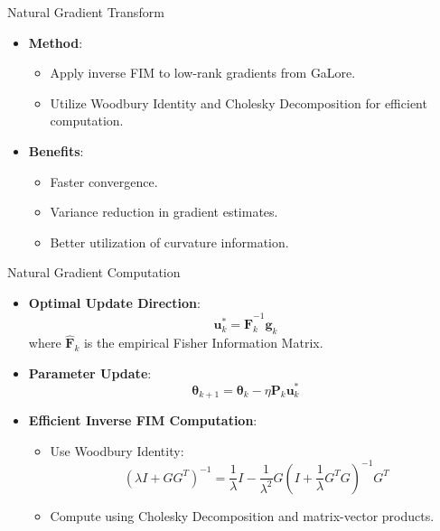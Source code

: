\documentclass{beamer}
\begin{document}
\begin{frame}{Natural Gradient Transform}
    \begin{itemize}
        \item \textbf{Method}:
            \begin{itemize}
                \item Apply inverse FIM to low-rank gradients from GaLore.
                \item Utilize Woodbury Identity and Cholesky Decomposition for efficient computation.
            \end{itemize}
        \item \textbf{Benefits}:
            \begin{itemize}
                \item Faster convergence.
                \item Variance reduction in gradient estimates.
                \item Better utilization of curvature information.
            \end{itemize}
    \end{itemize}
\end{frame}

\begin{frame}{Natural Gradient Computation}
    \begin{itemize}
        \item \textbf{Optimal Update Direction}:
            \[
            \mathbf{u}_k^* = \mathbf{\hat{F}}_k^{-1} \mathbf{g}_k
            \]
            where \(\mathbf{\hat{F}}_k\) is the empirical Fisher Information Matrix.
        \item \textbf{Parameter Update}:
            \[
            \mathbf{\theta}_{k+1} = \mathbf{\theta}_k - \eta \mathbf{P}_k \mathbf{u}_k^*
            \]
        \item \textbf{Efficient Inverse FIM Computation}:
            \begin{itemize}
                \item Use Woodbury Identity:
                    \[
                    (\lambda I + GG^T)^{-1} = \frac{1}{\lambda} I - \frac{1}{\lambda^2} G (I + \frac{1}{\lambda} G^T G)^{-1} G^T
                    \]
                \item Compute using Cholesky Decomposition and matrix-vector products.
            \end{itemize}
    \end{itemize}
\end{frame}
\end{document}
